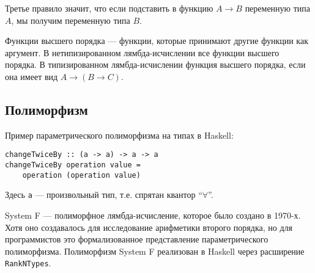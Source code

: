 Третье правило значит, что если подставить в функцию \(A \to B\) переменную типа \(A\), мы получим переменную типа \(B\).

Функции высшего порядка --- функции, которые принимают другие функции как аргумент. В нетипизированном лямбда-исчислении все функции высшего порядка. В типизированном лямбда-исчислении функция высшего порядка, если она имеет вид \(A \to (B \to C)\).

\subsection{Полиморфизм}

Пример параметрического полиморфизма на типах в Haskell:

\begin{verbatim}
changeTwiceBy :: (a -> a) -> a -> a
changeTwiceBy operation value =
    operation (operation value)
\end{verbatim}

Здесь \texttt{a} --- произвольный тип, т.е. спрятан квантор ``\(\forall\)''.

System F --- полиморфное лямбда-исчисление, которое было создано в 1970-х. Хотя оно создавалось для исследование арифметики второго порядка, но для программистов это формализованное представление параметрического полиморфизма. Полиморфизм System F реализован в Haskell через расширение \texttt{RankNTypes}.
